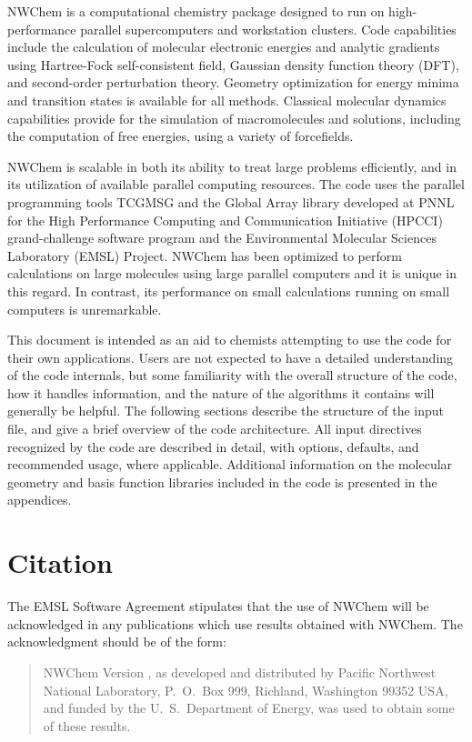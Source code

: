 \label{sec:intro}

NWChem is a computational chemistry package designed to run on
high-performance parallel supercomputers and workstation clusters.
Code capabilities include the calculation of molecular electronic
energies and analytic gradients using Hartree-Fock self-consistent field, Gaussian
density function theory (DFT), and second-order perturbation theory.
Geometry optimization for energy minima and transition states is
available for all methods.  Classical molecular dynamics capabilities
provide for the simulation of macromolecules and solutions, including
the computation of free energies, using a variety of forcefields.

NWChem is scalable in both its ability to treat large problems
efficiently, and in its utilization of available parallel computing
resources.  The code uses the parallel programming tools TCGMSG and
the Global Array library developed at PNNL for the High Performance
Computing and Communication Initiative (HPCCI) grand-challenge
software program and the Environmental Molecular Sciences Laboratory
(EMSL) Project.  NWChem has been optimized to perform calculations on
large molecules using large parallel computers and it is unique in
this regard.  In contrast, its performance on small calculations
running on small computers is unremarkable.

This document is intended as an aid to chemists attempting to
use the code for their own applications.  Users are not expected to
have a detailed understanding of the code internals, but some
familiarity with the overall structure of the code, how it handles
information, and the nature of the algorithms it contains will
generally be helpful.  The following sections describe the structure
of the input file, and give a brief overview of the code
architecture.  All input directives recognized by the code are
described in detail, with options, defaults, and recommended usage,
where applicable.  Additional information on the molecular geometry
and basis function libraries included in the code is presented in the
appendices.

\section{Citation}

The EMSL Software Agreement stipulates that the use of NWChem will be
acknowledged in any publications which use results obtained with
NWChem.  The acknowledgment should be of the form:
\begin{quote}

  NWChem Version \nwchemversion, as developed and distributed by
  Pacific Northwest National Laboratory, P.~O.~Box 999, Richland,
  Washington 99352 USA, and funded by the U.~S.~Department of Energy,
  was used to obtain some of these results.
\end{quote}

